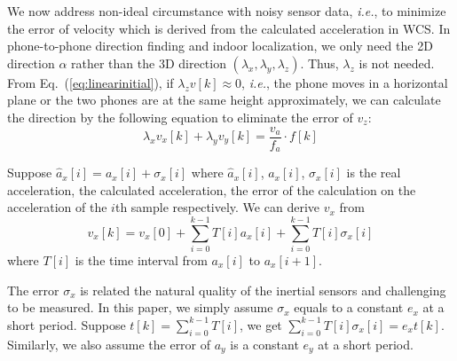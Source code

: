 \documentclass[]{sig-alternate-10pt}
\def\ie{\textit{i.e.}\xspace}
\newcommand{\eqqref}[1]{Eq.~(\ref{#1})}
\begin{document}
We now address non-ideal circumstance with noisy sensor data, \ie,
 to minimize the error of velocity
 which is derived from the calculated acceleration in WCS.
In phone-to-phone direction finding and indoor localization, we only need
the 2D direction $\alpha$ rather than the 3D direction
$(\lambda_x,\lambda_y,\lambda_z)$. Thus, $\lambda_z$ is not needed. From \eqqref{eq:linearinitial}, if
$\lambda_zv[k]\approx 0$, \ie, the phone moves in a horizontal plane or the two phones are at
the same height approximately, we can calculate the direction by
 the following equation to eliminate the error of $v_z$:
\begin{equation}
    \lambda_xv_x[k]+\lambda_yv_y[k]=\frac{v_{a}}{f_{a}}\cdot f[k]
    \label{eq:simplydirection}
\end{equation}

Suppose $\hat{a}_x[i]=a_x[i]+\sigma_x[i]$ where $\hat{a}_x[i]$, $a_x[i]$,
$\sigma_x[i]$ is the real acceleration, the calculated acceleration,
the error of the calculation on the acceleration of the $i$th sample respectively. We can
derive $v_x$ from
\[
v_x[k]=v_x[0]+\sum_{i=0}^{k-1}T[i]a_x[i]+\sum_{i=0}^{k-1}T[i]\sigma_x[i]
\]
where $T[i]$ is the time interval from $a_x[i]$ to $a_x[i+1]$.

The error $\sigma_x$ is related the natural quality of the inertial
sensors and challenging to be measured. In this paper, we simply
assume $\sigma_x$ equals to a constant $e_x$ at a short period.
Suppose $t[k]=\sum_{i=0}^{k-1}T[i]$, we get
$\sum_{i=0}^{k-1}T[i]\sigma_x[i]=e_xt[k]$. Similarly, we also assume
the error of $a_y$ is a constant $e_y$ at a short period.
\end{document}
